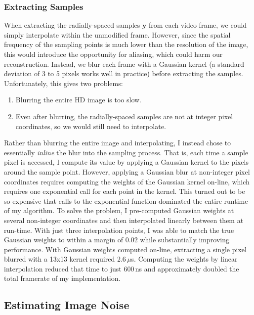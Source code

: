 \documentclass{article}
\begin{document}
\subsubsection{Extracting Samples}
\label{sec:sampling}

When extracting the radially-spaced samples $\textbf{y}$ from each video frame, we could simply interpolate within the unmodified frame. However, since the spatial frequency of the sampling points is much lower than the resolution of the image, this would introduce the opportunity for aliasing, which could harm our reconstruction. Instead, we blur each frame with a Gaussian kernel (a standard deviation of 3 to 5 pixels works well in practice) before extracting the samples. Unfortunately, this gives two problems: 

\begin{enumerate}
	\item Blurring the entire HD image is too slow.
	\item Even after blurring, the radially-spaced samples are not at integer pixel coordinates, so we would still need to interpolate.
\end{enumerate}

Rather than blurring the entire image and interpolating, I instead chose to essentially \emph{inline} the blur into the sampling process. 
That is, each time a sample pixel is accessed, I compute its value by applying a Gaussian kernel to the pixels around the sample point. 
However, applying a Gaussian blur at non-integer pixel coordinates requires computing the weights of the Gaussian kernel on-line, which requires one exponential call for each point in the kernel. 
This turned out to be so expensive that calls to the exponential function dominated the entire runtime of my algorithm. 
To solve the problem, I pre-computed Gaussian weights at several non-integer coordinates and then interpolated linearly between them at run-time. 
With just three interpolation points, I was able to match the true Gaussian weights to within a margin of 0.02 while substantially improving performance. 
With Gaussian weights computed on-line, extracting a single pixel blurred with a 13x13 kernel required 2.6\,$\mu$s. Computing the weights by linear interpolation reduced that time to just 600\,ns and approximately doubled the total framerate of my implementation. 

\subsection{Estimating Image Noise}
\end{document}
